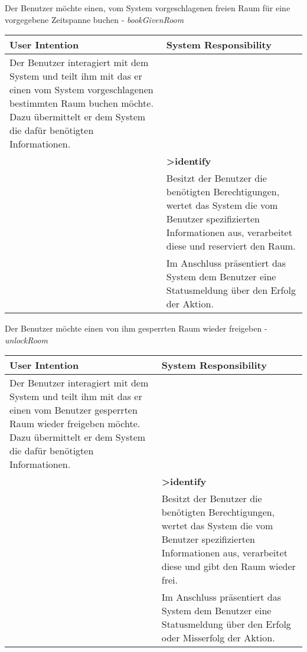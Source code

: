 \begin{table}[h]
	Der Benutzer möchte einen, vom System vorgeschlagenen freien Raum für eine vorgegebene Zeitspanne buchen - \textit{bookGivenRoom}\\
	\begin{tabularx}{\textwidth}{|X|X|}
	\rowcolor{heading} \textbf{User Intention} & \textbf{System Responsibility}\\ \hline
	Der Benutzer interagiert mit dem System und teilt ihm mit das er einen vom System vorgeschlagenen bestimmten Raum buchen möchte. Dazu übermittelt er dem System die dafür benötigten Informationen. & \\  \hline
	 & \textbf{>identify} \\ \hline
	 & Besitzt der Benutzer die benötigten Berechtigungen, wertet das System die vom Benutzer spezifizierten Informationen aus, verarbeitet diese und reserviert den Raum.\\ \hline
	 &  Im Anschluss präsentiert das System dem Benutzer eine Statusmeldung über den Erfolg der Aktion.\\ \hline
	\end{tabularx}
	
	Der Benutzer möchte einen von ihm gesperrten Raum wieder freigeben - \textit{unlockRoom}\\
	\begin{tabularx}{\textwidth}{|X|X|}
	\rowcolor{heading} \textbf{User Intention} & \textbf{System Responsibility}\\ \hline
	Der Benutzer interagiert mit dem System und teilt ihm mit das er einen vom Benutzer gesperrten Raum wieder freigeben möchte. Dazu übermittelt er dem System die dafür benötigten Informationen. & \\  \hline
	 & \textbf{>identify} \\ \hline
	 & Besitzt der Benutzer die benötigten Berechtigungen, wertet das System die vom Benutzer spezifizierten Informationen aus, verarbeitet diese und gibt den Raum wieder frei.\\ \hline
	 &  Im Anschluss präsentiert das System dem Benutzer eine Statusmeldung über den Erfolg oder Misserfolg der Aktion.\\ \hline
	\end{tabularx}
\end{table}



